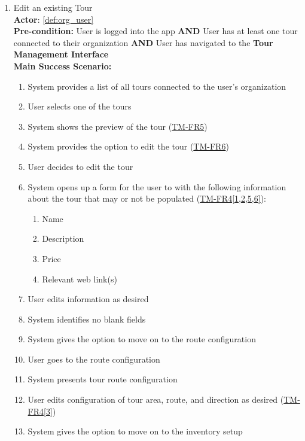 \documentclass{article}
\begin{document}
\begin{enumerate}[label=\textbf{UC\arabic*}]
    \item \label{uc:3} Edit an existing Tour \\
        \textbf{Actor}: \ref{def:org_user} \\
        \textbf{Pre-condition:} User is logged into the app \textbf{AND} User has at least one tour connected to their organization \textbf{AND} User has navigated to the \textbf{Tour Management Interface} \\

        \textbf{Main Success Scenario:}
        \begin{enumerate}[label=\textbf{\arabic*.}]
            \item System provides a list of all tours connected to the user’s organization
            \item User selects one of the tours
            \item System shows the preview of the tour (\hyperref[ssub:tour_management]{TM-FR5})
            \item System provides the option to edit the tour (\hyperref[ssub:tour_management]{TM-FR6})
            \item User decides to edit the tour
            \item System opens up a form for the user to with the following information about the tour that may or not be populated (\hyperref[ssub:tour_management]{TM-FR4[1,2,5,6]}):
            \begin{enumerate}
                \item Name
                \item Description
                \item Price
                \item Relevant web link(s)
            \end{enumerate}
            \item User edits information as desired
            \item System identifies no blank fields
            \item System gives the option to move on to the route configuration
            \item User goes to the route configuration
            \item System presents tour route configuration
            \item User edits configuration of tour area, route, and direction as desired (\hyperref[ssub:tour_management]{TM-FR4[3]})
            \item System gives the option to move on to the inventory setup

\end{enumerate}
\end{enumerate}
\end{document}
